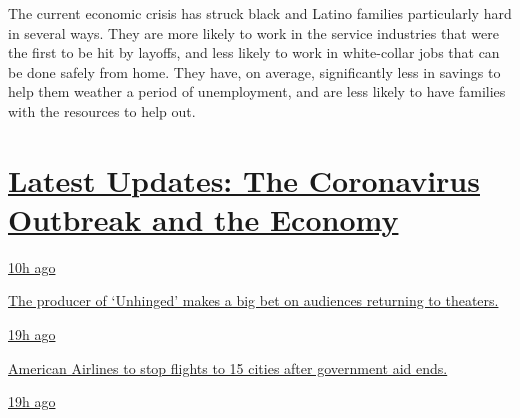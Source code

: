 The current economic crisis has struck black and Latino families
particularly hard in several ways. They are more likely to work in the
service industries that were the first to be hit by layoffs, and less
likely to work in white-collar jobs that can be done safely from home.
They have, on average, significantly less in savings to help them
weather a period of unemployment, and are less likely to have families
with the resources to help out.

\hypertarget{latest-updates-the-coronavirus-outbreak-and-the-economy}{%
\section{\texorpdfstring{\href{https://www.nytimes3xbfgragh.onion/live/2020/08/20/business/stock-market-today-coronavirus?action=click\&pgtype=Article\&state=default\&region=MAIN_CONTENT_1\&context=storylines_live_updates}{Latest
Updates: The Coronavirus Outbreak and the
Economy}}{Latest Updates: The Coronavirus Outbreak and the Economy}}\label{latest-updates-the-coronavirus-outbreak-and-the-economy}}

\href{https://www.nytimes3xbfgragh.onion/live/2020/08/20/business/stock-market-today-coronavirus?action=click\&pgtype=Article\&state=default\&region=MAIN_CONTENT_1\&context=storylines_live_updates\#the-producer-of-unhinged-makes-a-big-bet-on-audiences-returning-to-theaters}{10h
ago}

\href{https://www.nytimes3xbfgragh.onion/live/2020/08/20/business/stock-market-today-coronavirus?action=click\&pgtype=Article\&state=default\&region=MAIN_CONTENT_1\&context=storylines_live_updates\#the-producer-of-unhinged-makes-a-big-bet-on-audiences-returning-to-theaters}{The
producer of `Unhinged' makes a big bet on audiences returning to
theaters.}

\href{https://www.nytimes3xbfgragh.onion/live/2020/08/20/business/stock-market-today-coronavirus?action=click\&pgtype=Article\&state=default\&region=MAIN_CONTENT_1\&context=storylines_live_updates\#american-airlines-to-stop-flights-to-15-cities-after-government-aid-ends}{19h
ago}

\href{https://www.nytimes3xbfgragh.onion/live/2020/08/20/business/stock-market-today-coronavirus?action=click\&pgtype=Article\&state=default\&region=MAIN_CONTENT_1\&context=storylines_live_updates\#american-airlines-to-stop-flights-to-15-cities-after-government-aid-ends}{American
Airlines to stop flights to 15 cities after government aid ends.}

\href{https://www.nytimes3xbfgragh.onion/live/2020/08/20/business/stock-market-today-coronavirus?action=click\&pgtype=Article\&state=default\&region=MAIN_CONTENT_1\&context=storylines_live_updates\#without-school-plays-and-assemblies-a-technicians-livelihood-withers}{19h
ago}

